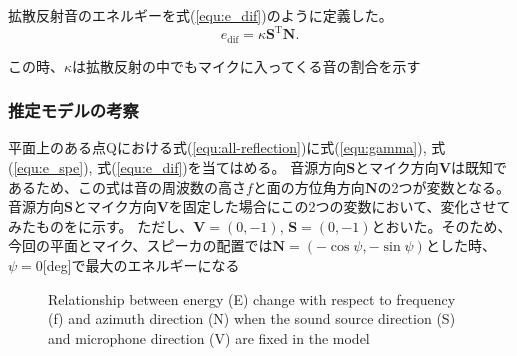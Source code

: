 拡散反射音のエネルギーを式(\ref{equ:e_dif})のように定義した。
\begin{equation}
    \label{equ:e_dif}
    e_\mathrm{dif} = \kappa\mathbf{S}^{\mathrm{T}}\mathbf{N}.
\end{equation}
    
この時、$\kappa$は拡散反射の中でもマイクに入ってくる音の割合を示す

\subsubsection{推定モデルの考察}
平面上のある点Qにおける式(\ref{equ:all-reflection})に式(\ref{equ:gamma}), 式(\ref{equ:e_spe}), 式(\ref{equ:e_dif})を当てはめる。
音源方向$\mathbf{S}$とマイク方向$\mathbf{V}$は既知であるため、この式は音の周波数の高さ$f$と面の方位角方向$\mathbf{N}$の2つが変数となる。
音源方向$\mathbf{S}$とマイク方向$\mathbf{V}$を固定した場合にこの2つの変数において、変化させてみたものをに示す。
ただし、$\mathbf{V}=(0,-1)$, $\mathbf{S}=(0,-1)$とおいた。そのため、今回の平面とマイク、スピーカの配置では$\mathbf{N} = (-\cos{\psi}, -\sin{\psi})$とした時、$\psi =0$[deg]で最大のエネルギーになる

\begin{figure}[t]
  \centering
  \centering
 \caption{Relationship between energy (E) change with respect to frequency (f) and azimuth direction (N) when the sound source direction (S) and microphone direction (V) are fixed in the model}\label{fig:e_f&N}
\end{figure}

